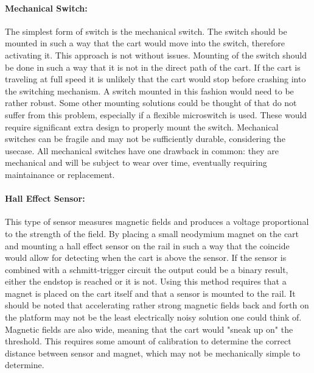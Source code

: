 \paragraph{Mechanical Switch:} %
\label{par:mechanical_switch}
The simplest form of switch is the mechanical switch.
The switch should be mounted in such a way that the cart would move into the switch, therefore activating it.
This approach is not without issues.
Mounting of the switch should be done in such a way that it is not in the direct path of the cart.
If the cart is traveling at full speed it is unlikely that the cart would stop before crashing into the switching mechanism.
A switch mounted in this fashion would need to be rather robust.
Some other mounting solutions could be thought of that do not suffer from this problem, especially if a flexible microswitch is used.
These would require significant extra design to properly mount the switch.
Mechanical switches can be fragile and may not be sufficiently durable, considering the usecase.
All mechanical switches have one drawback in common: they are mechanical and will be subject to wear over time, eventually requiring maintainance or replacement.

\paragraph{Hall Effect Sensor:} %
\label{par:hall_effect_sensor}
This type of sensor measures magnetic fields and produces a voltage proportional to the strength of the field.
By placing a small neodymium magnet on the cart and mounting a hall effect sensor on the rail in such a way that the coincide would allow for detecting when the cart is above the sensor.
If the sensor is combined with a schmitt-trigger circuit the output could be a binary result, either the endstop is reached or it is not.
Using this method requires that a magnet is placed on the cart itself and that a sensor is mounted to the rail.
It should be noted that accelerating rather strong magnetic fields back and forth on the platform may not be the least electrically noisy solution one could think of.
Magnetic fields are also wide, meaning that the cart would "sneak up on" the threshold.
This requires some amount of calibration to determine the correct distance between sensor and magnet, which may not be mechanically simple to determine. 
